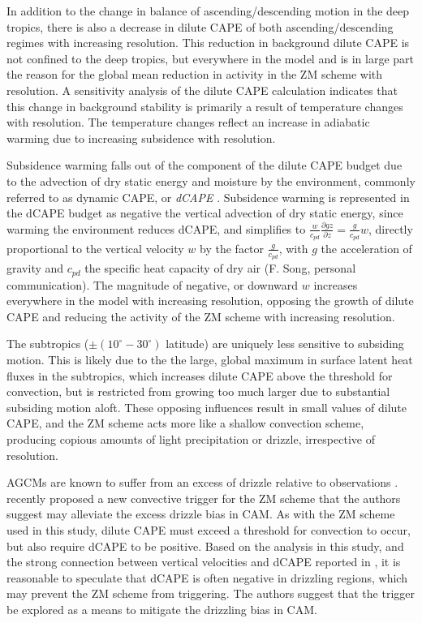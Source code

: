 \documentclass[times]{qjrms4}
\begin{document}
In addition to the change in balance of ascending/descending motion in the deep tropics, there is also a decrease in dilute CAPE of both ascending/descending regimes with increasing resolution. This reduction in background dilute CAPE is not confined to the deep tropics, but everywhere in the model and is in large part the reason for the global mean reduction in activity in the ZM scheme with resolution. A sensitivity analysis of the dilute CAPE calculation indicates that this change in background stability is primarily a result of temperature changes with resolution. The temperature changes reflect an increase in adiabatic warming due to increasing subsidence with resolution. 

Subsidence warming falls out of the component of the dilute CAPE budget due to the advection of dry static energy and moisture by the environment, commonly referred to as dynamic CAPE, or {\em{dCAPE}} \citep{XZ2000JGR,Z2002JGR}. Subsidence warming is represented in the dCAPE budget as negative the vertical advection of dry static energy, since warming the environment reduces dCAPE, and simplifies to $\frac{w}{c_{pd}} \frac{\partial gz}{\partial z} = \frac{g}{c_{pd}} w$, directly proportional to the vertical velocity $w$ by the factor $\frac{g}{c_{pd}}$, with $g$ the acceleration of gravity and $c_{pd}$ the specific heat capacity of dry air (F. Song, personal communication). The magnitude of negative, or downward $w$ increases everywhere in the model with increasing resolution, opposing the growth of dilute CAPE and reducing the activity of the ZM scheme with increasing resolution.

The subtropics ($\pm (10^{\circ}-30^{\circ})$ latitude) are uniquely less sensitive to subsiding motion. This is likely due to the the large, global maximum in surface latent heat fluxes in the subtropics, which increases dilute CAPE above the threshold for convection, but is restricted from growing too much larger due to substantial subsiding motion aloft. These opposing influences result in small values of dilute CAPE, and the ZM scheme acts more like a shallow convection scheme, producing copious amounts of light precipitation or drizzle, irrespective of resolution. 

AGCMs are known to suffer from an excess of drizzle relative to observations \citep{D2006JCLIM}. \cite{XETAL2019JAMES} recently proposed a new convective trigger for the ZM scheme that the authors suggest may alleviate the excess drizzle bias in CAM. As with the ZM scheme used in this study, dilute CAPE must exceed a threshold for convection to occur, but \cite{XETAL2019JAMES} also require dCAPE to be positive. Based on the analysis in this study, and the strong connection between vertical velocities and dCAPE reported in \cite{SZ2018JCLIM}, it is reasonable to speculate that dCAPE is often negative in drizzling regions, which may prevent the ZM scheme from triggering. The authors suggest that the \cite{XETAL2019JAMES} trigger be explored as a means to mitigate the drizzling bias in CAM.
\end{document}
